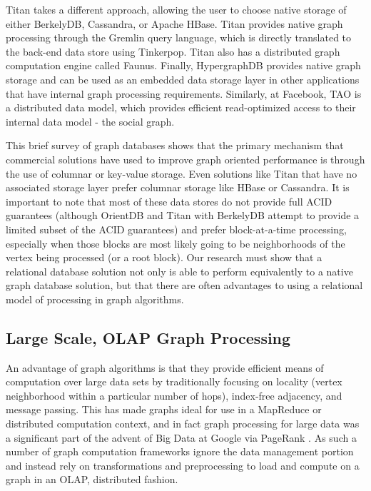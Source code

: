 \documentclass[11pt,letterpaper]{article}
\begin{document}
Titan \cite{broecheler_titan_2015} takes a different approach, allowing the user to choose native storage of either BerkelyDB, Cassandra, or Apache HBase. Titan provides native graph processing through the Gremlin query language, which is directly translated to the back-end data store using Tinkerpop. Titan also has a distributed graph computation engine called Faunus. Finally, HypergraphDB \cite{iordanov_hypergraphdb_2012} provides native graph storage and can be used as an embedded data storage layer in other applications that have internal graph processing requirements. Similarly, at Facebook, TAO \cite{bronson_tao:_2013} is a distributed data model, which provides efficient read-optimized access to their internal data model - the social graph.

This brief survey of graph databases shows that the primary mechanism that commercial solutions have used to improve graph oriented performance is through the use of columnar or key-value storage. Even solutions like Titan that have no associated storage layer prefer columnar storage like HBase or Cassandra. It is important to note that most of these data stores do not provide full ACID guarantees (although OrientDB and Titan with BerkelyDB attempt to provide a limited subset of the ACID guarantees) and prefer block-at-a-time processing, especially when those blocks are most likely going to be neighborhoods of the vertex being processed (or a root block). Our research must show that a relational database solution not only is able to perform equivalently to a native graph database solution, but that there are often advantages to using a relational model of processing in graph algorithms.

\subsection*{Large Scale, OLAP Graph Processing}

An advantage of graph algorithms is that they provide efficient means of computation over large data sets by traditionally focusing on locality (vertex neighborhood within a particular number of hops), index-free adjacency, and message passing. This has made graphs ideal for use in a MapReduce or distributed computation context, and in fact graph processing for large data was a significant part of the advent of Big Data at Google via PageRank \cite{page_pagerank_1999}. As such a number of graph computation frameworks ignore the data management portion and instead rely on transformations and preprocessing to load and compute on a graph in an OLAP, distributed fashion.
\end{document}
